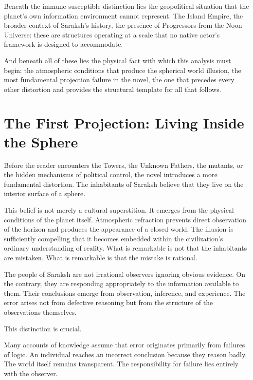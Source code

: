 \documentclass[12pt, a4paper]{article}
\theoremstyle{plain}
\theoremstyle{definition}
\theoremstyle{remark}
\begin{document}
Beneath the immune-susceptible distinction lies
the geopolitical situation that the planet's own
information environment cannot represent. The
Island Empire, the broader context of Saraksh's
history, the presence of Progressors from the
Noon Universe: these are structures operating at
a scale that no native actor's framework is
designed to accommodate.

And beneath all of these lies the physical fact
with which this analysis must begin: the
atmospheric conditions that produce the spherical
world illusion, the most fundamental projection
failure in the novel, the one that precedes every
other distortion and provides the structural
template for all that follows.

\section{The First Projection: Living Inside the Sphere}

Before the reader encounters the Towers, the Unknown
Fathers, the mutants, or the hidden mechanisms of
political control, the novel introduces a more
fundamental distortion. The inhabitants of Saraksh
believe that they live on the interior surface
of a sphere.

This belief is not merely a cultural superstition.
It emerges from the physical conditions of the
planet itself. Atmospheric refraction prevents
direct observation of the horizon and produces
the appearance of a closed world. The illusion
is sufficiently compelling that it becomes embedded
within the civilization's ordinary understanding
of reality. What is remarkable is not that the
inhabitants are mistaken. What is remarkable is
that the mistake is rational.

The people of Saraksh are not irrational observers
ignoring obvious evidence. On the contrary, they
are responding appropriately to the information
available to them. Their conclusions emerge from
observation, inference, and experience. The error
arises not from defective reasoning but from the
structure of the observations themselves.

This distinction is crucial.

Many accounts of knowledge assume that error
originates primarily from failures of logic.
An individual reaches an incorrect conclusion
because they reason badly. The world itself
remains transparent. The responsibility for
failure lies entirely with the observer.
\end{document}
